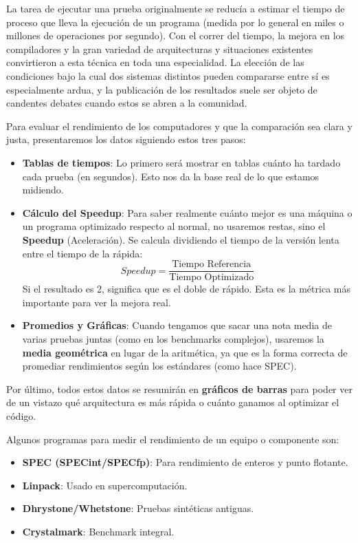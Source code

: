 \documentclass[11pt,a4paper]{article}
\begin{document}
La tarea de ejecutar una prueba originalmente se reducía a estimar el tiempo de proceso que lleva la ejecución de un programa (medida por lo general en miles o millones de operaciones por segundo). Con el correr del tiempo, la mejora en los compiladores y la gran variedad de arquitecturas y situaciones existentes convirtieron a esta técnica en toda una especialidad. La elección de las condiciones bajo la cual dos sistemas distintos pueden compararse entre sí es especialmente ardua, y la publicación de los resultados suele ser objeto de candentes debates cuando estos se abren a la comunidad.

Para evaluar el rendimiento de los computadores y que la comparación sea clara y justa, presentaremos los datos siguiendo estos tres pasos:

\begin{itemize}
    \item \textbf{Tablas de tiempos}: Lo primero será mostrar en tablas cuánto ha tardado cada prueba (en segundos). Esto nos da la base real de lo que estamos midiendo.
    \item \textbf{Cálculo del Speedup}: Para saber realmente cuánto mejor es una máquina o un programa optimizado respecto al normal, no usaremos restas, sino el \textbf{Speedup} (Aceleración). Se calcula dividiendo el tiempo de la versión lenta entre el tiempo de la rápida:
\[ Speedup = \frac{\text{Tiempo Referencia}}{\text{Tiempo Optimizado}} \]
Si el resultado es 2, significa que es el doble de rápido. Esta es la métrica más importante para ver la mejora real.
    \item \textbf{Promedios y Gráficas}: Cuando tengamos que sacar una nota media de varias pruebas juntas (como en los benchmarks complejos), usaremos la \textbf{media geométrica} en lugar de la aritmética, ya que es la forma correcta de promediar rendimientos según los estándares (como hace SPEC).
\end{itemize}

Por último, todos estos datos se resumirán en \textbf{gráficos de barras} para poder ver de un vistazo qué arquitectura es más rápida o cuánto ganamos al optimizar el código.

Algunos programas para medir el rendimiento de un equipo o componente son:

\begin{itemize}
    \item \textbf{SPEC (SPECint/SPECfp)}: Para rendimiento de enteros y punto flotante.
    \item \textbf{Linpack}: Usado en supercomputación.
    \item \textbf{Dhrystone/Whetstone}: Pruebas sintéticas antiguas.
    \item \textbf{Crystalmark}: Benchmark integral. 
\end{itemize}
\end{document}
